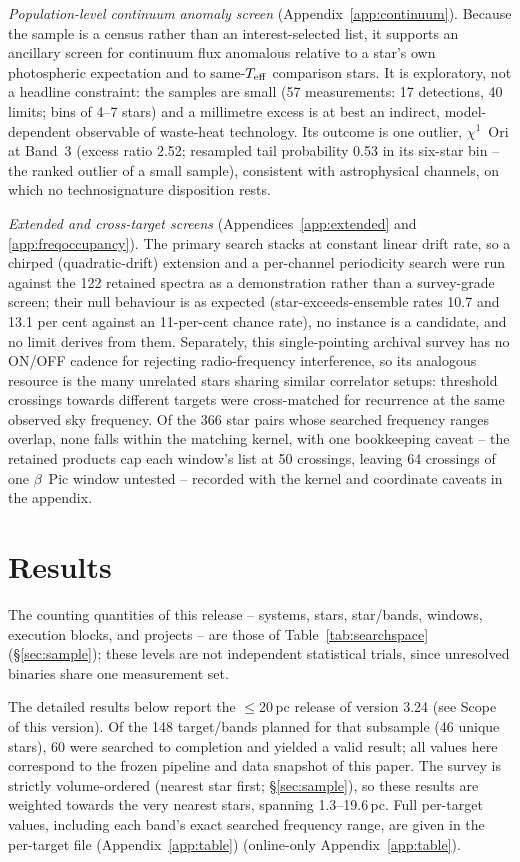\documentclass{openjournal}
\begin{document}
\emph{Population-level continuum anomaly screen}
(Appendix~\ref{app:continuum}). Because the sample is a census rather
than an interest-selected list, it supports an ancillary screen for
continuum flux anomalous relative to a star's own photospheric
expectation and to same-$T_{\rm eff}$ comparison stars. It is
exploratory, not a headline constraint: the samples are small (57
measurements: 17 detections, 40 limits; bins of 4--7 stars) and a
millimetre excess is at best an indirect, model-dependent observable
of waste-heat technology. Its outcome is one outlier, $\chi^1$~Ori at
Band~3 (excess ratio 2.52; resampled tail probability 0.53 in its
six-star bin -- the ranked outlier of a small sample), consistent
with astrophysical channels, on which no technosignature disposition
rests.

\emph{Extended and cross-target screens}
(Appendices~\ref{app:extended} and \ref{app:freqoccupancy}). The
primary search stacks at constant linear drift rate, so a chirped
(quadratic-drift) extension and a per-channel periodicity search were
run against the 122 retained spectra as a demonstration rather than a
survey-grade screen; their null behaviour is as expected
(star-exceeds-ensemble rates 10.7 and 13.1 per cent against an
11-per-cent chance rate), no instance is a candidate, and no limit
derives from them. Separately, this
single-pointing archival survey has no ON/OFF cadence for rejecting
radio-frequency interference, so its analogous resource is the many
unrelated stars sharing similar correlator setups: threshold crossings
towards different targets were cross-matched for recurrence at the
same observed sky frequency. Of the 366 star pairs whose searched
frequency ranges overlap, none falls within the matching kernel, with
one bookkeeping caveat -- the retained products cap each window's list
at 50 crossings, leaving 64 crossings of one $\beta$~Pic window
untested -- recorded with the kernel and coordinate caveats in the
appendix.
\section{Results}
\label{sec:results}

The counting quantities of this release -- systems, stars,
star/bands, windows, execution blocks, and projects -- are those of
Table~\ref{tab:searchspace} (\S\ref{sec:sample}); these levels are
not independent statistical trials, since unresolved binaries share
one measurement set.

The detailed results below report the $\le$20\,pc release of version
3.24 (see Scope of this version). Of the 148 target/bands planned for
that subsample (46 unique stars), 60 were searched to completion and
yielded a valid result; all values here correspond to the frozen
pipeline and data snapshot of this paper. The survey is strictly
volume-ordered (nearest star first; \S\ref{sec:sample}), so these
results are weighted towards the very nearest stars, spanning
1.3--19.6\,pc. Full per-target values, including each band's exact
searched frequency range, are given in the per-target file (Appendix~\ref{app:table})
(online-only Appendix~\ref{app:table}).
\end{document}
